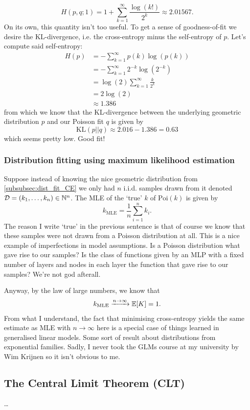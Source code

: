 \documentclass[11pt]{article}
\begin{document}
\begin{appendices}
$$
H(p,q;1)
=
1+\sum_{k=1}^{\infty}\frac{\log(k!)}{2^k}
\approx
2.01567.
$$
On its own, this quantity isn't too useful. To get a sense of goodness-of-fit we desire the KL-divergence, i.e. the cross-entropy minus the self-entropy of $p$. Let's compute said self-entropy:
\begin{align*}
    H(p)
    &=
    -\sum_{k=1}^{\infty}p(k)\log(p(k))\\
    &=
    -\sum_{k=1}^{\infty}2^{-k}\log(2^{-k})\\
    &=
    \log(2)\sum_{k=1}^{\infty}\frac{k}{2^k}\\
    &=
    2\log(2)\\
    &\approx
    1.386
\end{align*}
from which we know that the KL-divergence between the underlying geometric distribution $p$ and our Poisson fit $q$ is given by
$$
\text{KL}(p||q)
\approx
2.016-1.386
=
0.63
$$
which seems pretty low. Good fit!

\subsubsection{Distribution fitting using maximum likelihood estimation}
Suppose instead of knowing the nice geometric distribution from \autoref{subsubsec:dist_fit_CE} we only had $n$ i.i.d. samples drawn from it denoted $\mathcal{D}=(k_1,\dots,k_n)\in\mathbb{N}^n$. The MLE of the `true' $k$ of $\text{Poi}(k)$ is given by
$$
k_{\text{MLE}}
=
\frac{1}{n}\sum_{i=1}^n k_i.
$$
The reason I write `true' in the previous sentence is that of course we know that these samples were not drawn from a Poisson distribution at all. This is a nice example of imperfections in model assumptions. Is a Poisson distribution what gave rise to our samples? Is the class of functions given by an MLP with a fixed number of layers and nodes in each layer the function that gave rise to our samples? We're not god afterall.

Anyway, by the law of large numbers, we know that
$$
k_{\text{MLE}}\xrightarrow{n\to\infty}\mathbb{E}[K]=1.
$$
From what I understand, the fact that minimising cross-entropy yields the same estimate as MLE with $n\to\infty$ here is a special case of things learned in generalised linear models. Some sort of result about distributions from exponential families. Sadly, I never took the GLMs course at my university by Wim Krijnen so it isn't obvious to me.

\subsection{The Central Limit Theorem (CLT)}
\dots


\end{appendices}
\end{document}
